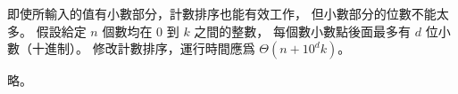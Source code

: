 \startEXERCISE
即使所輸入的值有小數部分，計數排序也能有效工作，
但小數部分的位數不能太多。
假設給定 $n$ 個數均在 $0$ 到 $k$ 之間的整數，
每個數小數點後面最多有 $d$ 位小數（十進制）。
修改計數排序，運行時間應爲 $\Theta(n+10^d k)$。
\stopEXERCISE

\startANSWER
略。
\stopANSWER
